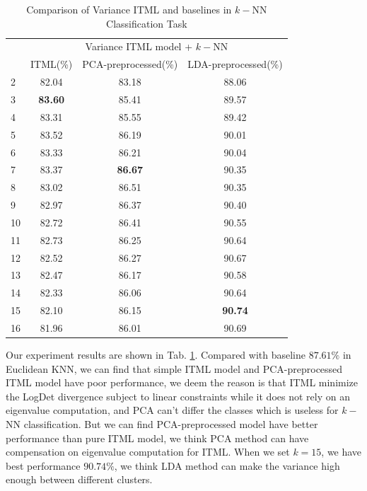 \documentclass[conference]{IEEEtran}
\begin{document}
\begin{table}[htbp]
	\centering
 	\newcommand{\tabincell}[2]{\begin{tabular}{@{}#1@{}}#2\end{tabular}}
 	\renewcommand\arraystretch{1.0}
 	\caption{Comparison of Variance ITML and baselines in $k-$NN Classification Task}
 	\label{base2}%
 		\begin{tabular}{@{}p{1cm}<{\centering}|c|c|c}
 		\hline
 		\multirow{2}{*}{\diagbox[height=2\line,width=1.42cm,font=\tiny]{$k$}{Acc.}{$\mathit{M}$}} &
 		\multicolumn{3}{c}{Variance ITML model + $k-$NN}\\
 		\cline{2-4}
 		& {ITML(\%)} & {PCA-preprocessed(\%)} & {LDA-preprocessed(\%)}\\
 		\hline
 		2   & 82.04 & 83.18 & 88.06\\
 		\hline
 		3   & \textbf{83.60} & 85.41 & 89.57\\
 		\hline
 		4   & 83.31 & 85.55 & 89.42\\
 		\hline
 		5   & 83.52  & 86.19 & 90.01\\
 		\hline
 		6   & 83.33  & 86.21 & 90.04\\
 		\hline
 		7   & 83.37  & \textbf{86.67} & 90.35\\
 		\hline
 		8   & 83.02  & 86.51 & 90.35\\
 		\hline
 		9   & 82.97  & 86.37 & 90.40\\
 		\hline
 		10   & 82.72  & 86.41 & 90.55\\
 		\hline
 		11   & 82.73  & 86.25 & 90.64\\
 		\hline
 		12   & 82.52  & 86.27 & 90.67\\
 		\hline
 		13   & 82.47  & 86.17 & 90.58\\
 		\hline
 		14   & 82.33  & 86.06 & 90.64\\
 		\hline
 		15   & 82.10  & 86.15 & \textbf{90.74}\\
 		\hline
 		16   & 81.96  & 86.01 & 90.69\\
 		\hline
 	\end{tabular}
\end{table}

Our experiment results are shown in Tab. \ref{base2}. Compared with baseline $87.61\%$ in Euclidean KNN, we can find that simple ITML model and PCA-preprocessed ITML model have poor performance, we deem the reason is that ITML minimize the LogDet divergence subject to linear constraints while it does not rely on an eigenvalue computation, and PCA can't differ the classes which is useless for $k-$NN classification. But we can find PCA-preprocessed model have better performance than pure ITML model, we think PCA method can have compensation on eigenvalue computation for ITML. When we set $k=15$, we have best performance $90.74\%$, we think LDA method can make the variance high enough between different clusters. 
\end{document}
